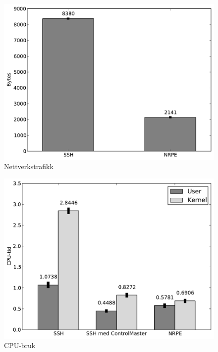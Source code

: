 
\begin{figure}[H]
    \centering
    \includegraphics[scale=0.6]{img/nettverkstrafikk}
    \caption{Nettverkstrafikk}
    \label{network_traffic}
\end{figure}

\begin{figure}[H]
    \centering
    \includegraphics[scale=0.6]{img/cpubruk}
    \caption{CPU-bruk}
    \label{cpu_usage}
\end{figure}





